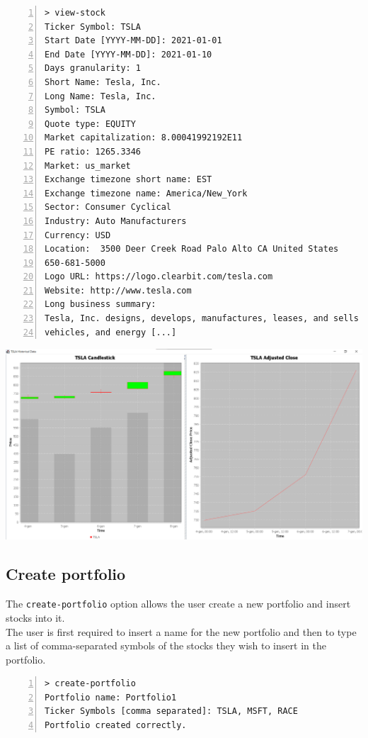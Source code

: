 \begin{lstlisting}[basicstyle=\footnotesize\ttfamily,language={},numbers=left,
numberstyle=\footnotesize,numbersep=8pt,frame=single]
> view-stock
Ticker Symbol: TSLA
Start Date [YYYY-MM-DD]: 2021-01-01
End Date [YYYY-MM-DD]: 2021-01-10
Days granularity: 1
Short Name: Tesla, Inc.
Long Name: Tesla, Inc.
Symbol: TSLA
Quote type: EQUITY
Market capitalization: 8.00041992192E11
PE ratio: 1265.3346
Market: us_market
Exchange timezone short name: EST
Exchange timezone name: America/New_York
Sector: Consumer Cyclical
Industry: Auto Manufacturers
Currency: USD
Location:  3500 Deer Creek Road Palo Alto CA United States
650-681-5000
Logo URL: https://logo.clearbit.com/tesla.com
Website: http://www.tesla.com
Long business summary:
Tesla, Inc. designs, develops, manufactures, leases, and sells electric
vehicles, and energy [...]
\end{lstlisting}

\hfill \break
{\centering
\includegraphics[scale=0.32]{img/user_manual/view_stock.png}\\
}

\subsection{Create portfolio}
The \texttt{create-portfolio} option allows the user create a new portfolio and insert stocks into it.\\
The user is first required to insert a name for the new portfolio and then to type a list of comma-separated symbols of the stocks they wish to insert in the portfolio.

\begin{lstlisting}[basicstyle=\footnotesize\ttfamily,language={},numbers=left,
numberstyle=\footnotesize,numbersep=8pt,frame=single]
> create-portfolio
Portfolio name: Portfolio1
Ticker Symbols [comma separated]: TSLA, MSFT, RACE
Portfolio created correctly.

\end{lstlisting}

